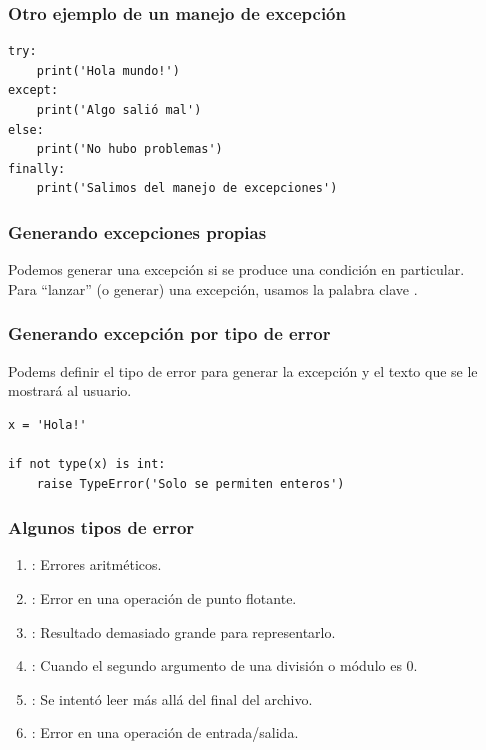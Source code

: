 \documentclass[12pt]{beamer}
\begin{document}
\begin{frame}[fragile]
\frametitle{Otro ejemplo de un manejo de excepción}
\begin{lstlisting}[caption=Manejo con un else]
try:
    print('Hola mundo!')
except:
    print('Algo salió mal')
else:
    print('No hubo problemas')
finally:
    print('Salimos del manejo de excepciones')
\end{lstlisting}
\end{frame}
\begin{frame}
\frametitle{Generando excepciones propias}
Podemos generar una excepción si se produce una condición en particular.
\\
\bigskip
\pause
Para \enquote{lanzar} (o generar) una excepción, usamos la palabra clave .
\end{frame}
\begin{frame}[fragile]
\frametitle{Generando excepción por tipo de error}
Podems definir el tipo de error para generar la excepción y el texto que se le mostrará al usuario.
\begin{lstlisting}[caption=Generando una excepción]
x = 'Hola!'

if not type(x) is int:
    raise TypeError('Solo se permiten enteros')
\end{lstlisting}    
\end{frame}
\begin{frame}
\frametitle{Algunos tipos de error}
\begin{enumerate}[<+->]
\item {}: Errores aritméticos.
\item {}: Error en una operación de punto flotante.
\item {}: Resultado demasiado grande para representarlo.
\item {}: Cuando el segundo argumento de una división o módulo es $0$.
\item {}: Se intentó leer más allá del final del archivo.
\item {}: Error en una operación de entrada/salida.
\end{enumerate}
\end{frame}
\end{document}
